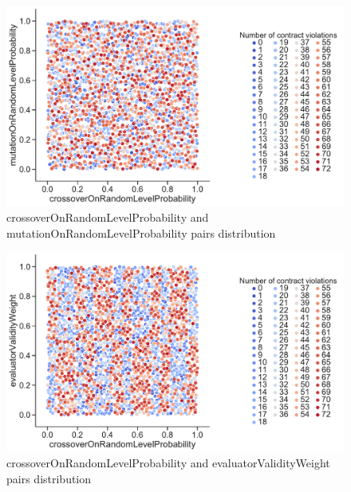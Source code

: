 \begin{figure}
	\centering
	\includegraphics[width=\textwidth]{images/PairsDistr/crossoverOnRandomLevelProbability_mutationOnRandomLevelProbability.pdf}
	\caption[crossoverOnRandomLevelProbability and mutationOnRandomLevelProbability pairs distribution]{crossoverOnRandomLevelProbability and mutationOnRandomLevelProbability pairs distribution}
	\label{fig:crossoverOnRandomLevelProbability_mutationOnRandomLevelProbability_pair}
\end{figure}
\begin{figure}
	\centering
	\includegraphics[width=\textwidth]{images/PairsDistr/crossoverOnRandomLevelProbability_evaluatorValidityWeight.pdf}
	\caption[crossoverOnRandomLevelProbability and evaluatorValidityWeight pairs distribution]{crossoverOnRandomLevelProbability and evaluatorValidityWeight pairs distribution}
	\label{fig:crossoverOnRandomLevelProbability_evaluatorValidityWeight_pair}
\end{figure}
